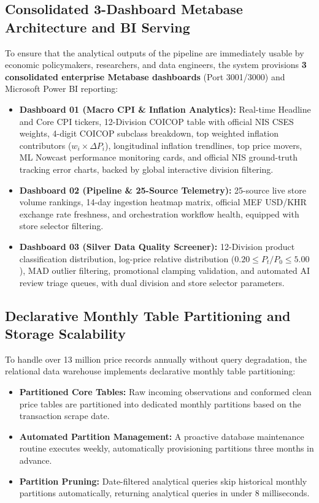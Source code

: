 \subsection{Consolidated 3-Dashboard Metabase Architecture and BI Serving}
\hs To ensure that the analytical outputs of the pipeline are immediately usable by economic policymakers, researchers, and data engineers, the system provisions \textbf{3 consolidated enterprise Metabase dashboards} (Port 3001/3000) and Microsoft Power BI reporting:
\begin{itemize}
    \item \textbf{Dashboard 01 (Macro CPI \& Inflation Analytics):} Real-time Headline and Core CPI tickers, 12-Division COICOP table with official NIS CSES weights, 4-digit COICOP subclass breakdown, top weighted inflation contributors ($w_i \times \Delta P_i$), longitudinal inflation trendlines, top price movers, ML Nowcast performance monitoring cards, and official NIS ground-truth tracking error charts, backed by global interactive division filtering.
    \item \textbf{Dashboard 02 (Pipeline \& 25-Source Telemetry):} 25-source live store volume rankings, 14-day ingestion heatmap matrix, official MEF USD/KHR exchange rate freshness, and orchestration workflow health, equipped with store selector filtering.
    \item \textbf{Dashboard 03 (Silver Data Quality Screener):} 12-Division product classification distribution, log-price relative distribution ($0.20 \le P_t/P_0 \le 5.00$), MAD outlier filtering, promotional clamping validation, and automated AI review triage queues, with dual division and store selector parameters.
\end{itemize}

\subsection{Declarative Monthly Table Partitioning and Storage Scalability}
\hs To handle over 13 million price records annually without query degradation, the relational data warehouse implements declarative monthly table partitioning:
\begin{itemize}
    \item \textbf{Partitioned Core Tables:} Raw incoming observations and conformed clean price tables are partitioned into dedicated monthly partitions based on the transaction scrape date.
    \item \textbf{Automated Partition Management:} A proactive database maintenance routine executes weekly, automatically provisioning partitions three months in advance.
    \item \textbf{Partition Pruning:} Date-filtered analytical queries skip historical monthly partitions automatically, returning analytical queries in under 8 milliseconds.
\end{itemize}

